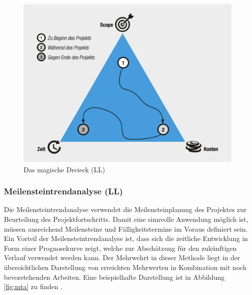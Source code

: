 \documentclass[ThesisDJ.tex]{subfiles}
\begin{document}
    \begin{figure}
        \includegraphics[scale=0.5]{magic_tri.png}
        \centering
        \caption{Das magische Dreieck (LL)}
        \label{fig:magic_tri}
    \end{figure}

    \subsubsection{Meilensteintrendanalyse (LL)}
    Die Meilensteintrendanalyse verwendet die Meilensteinplanung des Projektes zur Beurteilung des Projektfortschritts.
    Damit eine sinnvolle Anwendung möglich ist, müssen ausreichend Meilensteine und Fälligkeitstermine im Voraus definiert sein.
    Ein Vorteil der Meilensteintrendanalyse ist, dass sich die zeitliche Entwicklung in Form einer Prognosekurve zeigt, welche 
    zur Abschätzung für den zukünftigen Verlauf verwendet werden kann. Der Mehrwehrt in dieser Methode liegt in der 
    übersichtlichen Darstellung von erreichten Mehrwerten in Kombination mit noch bevorstehenden Arbeiten. Eine beispielhafte Darstellung ist in Abbildung
    \ref{fig:mta} zu finden \cite[S.~192]{kuster_handbuch_2022}.
\end{document}
